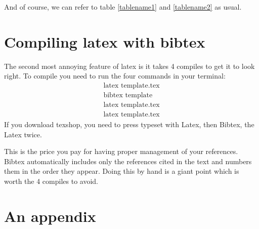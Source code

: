\documentclass[11pt]{article}
\numberwithin{equation}{section}
\def\bea{\begin{eqnarray}}
\def\eea{\end{eqnarray}}
\begin{document}
And of course, we can refer to table \ref{tablename1} and \ref{tablename2} as usual.
\section{Compiling latex with bibtex}

The second most annoying feature of latex is it takes 4 compiles to get it to look right.  To compile you need to run the four commands in your terminal:
\bea
&\text{latex template.tex}&\\
&\text{bibtex template}&\\
&\text{latex template.tex}&\\
&\text{latex template.tex}&
\eea
If you download texshop, you need to press typeset with Latex, then Bibtex, the Latex twice.

This is the price you pay for having proper management of your references.  Bibtex automatically includes only the references cited in the text and numbers them in the order they appear.  Doing this by hand is a giant point which is worth the 4 compiles to avoid.
\appendix
\section{An appendix}


\newpage
{}

%

\end{document}

